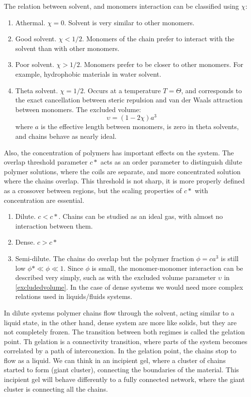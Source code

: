 The relation between solvent, and monomers interaction can be classified using
$\chi$:
\begin{enumerate}
  \item Athermal. $\chi=0$. Solvent is very similar to other monomers.
  \item Good solvent. $\chi<1/2$. Monomers of the chain prefer to interact with
  the solvent than with other monomers.
  \item Poor solvent. $\chi>1/2$. Monomers prefer to be closer to other
  monomers. For example, hydrophobic materials in water solvent.
  \item Theta solvent. $\chi=1/2$. Occurs at a temperature $T=\Theta$, and
  corresponds to the exact cancellation between steric repulsion and van der
  Waals attraction between monomers. The excluded volume:
  \begin{equation}\label{excludedvolume}
  \upsilon=(1-2\chi)a^3
  \end{equation}
  where $a$ is the effective length between monomers, is zero in theta solvents,
  and chains behave as nearly ideal.\citep{gennes_scaling_1979}
\end{enumerate}

Also, the concentration of polymers has important effects on the system. The
overlap threshold parameter $c*$ acts as an order parameter to distinguish dilute
polymer solutions, where the coils are separate, and more concentrated solution
where the chains overlap. This threshold is not sharp, it is more properly
defined as a crossover between regions, but the scaling properties of $c*$ with
concentration are essential.
\begin{enumerate}
  \item Dilute. $c<c*$. Chains can be studied as an ideal gas, with almost no
  interaction between them.
  \item Dense. $c>c*$
  \item Semi-dilute. The chains do overlap but the polymer fraction
  $\phi=ca^3$ is still low $\phi*\ll\phi\ll1$. Since $\phi$ is small, the monomer-monomer interaction can
  be described very simply, such as with the excluded volume parameter
  $\upsilon$ in \ref{excludedvolume}. In the case of dense systems we would need more complex
  relations used in liquids/fluids systems.
\end{enumerate}


In dilute systems polymer chains flow through
the solvent, acting similar to a liquid state, in the other hand, dense system
are more like solids, but they are not completely frozen. The transition between
both regimes is called the gelation point. Th gelation is a connectivity
transition, where parts of the system becomes correlated by a path of
interconexion. In the gelation point, the chains stop to flow as a liquid. We
can think in an incipient gel, where a cluster of chains started to form (giant cluster), connecting the boundaries of the
material. This incipient gel will behave differently to a fully connected
network, where the giant cluster is connecting all the chains.

